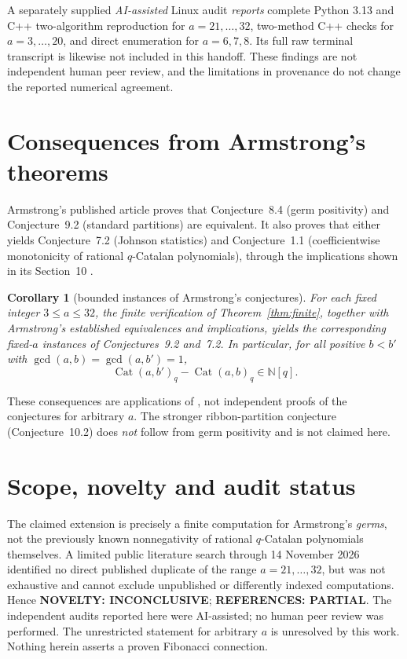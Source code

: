 \documentclass[11pt,a4paper]{article}
\newtheorem{corollary}{Corollary}
\newcommand{\NN}{\mathbb{N}}
\newcommand{\Cat}{\operatorname{Cat}}
\begin{document}
A separately supplied \emph{AI-assisted} Linux audit \emph{reports} complete Python 3.13 and C++ two-algorithm reproduction for $a=21,\ldots,32$, two-method C++ checks for $a=3,\ldots,20$, and direct enumeration for $a=6,7,8$. Its full raw terminal transcript is likewise not included in this handoff. These findings are not independent human peer review, and the limitations in provenance do not change the reported numerical agreement.

\section{Consequences from Armstrong's theorems}
Armstrong's published article proves that Conjecture~8.4 (germ positivity) and Conjecture~9.2 (standard partitions) are equivalent. It also proves that either yields Conjecture~7.2 (Johnson statistics) and Conjecture~1.1 (coefficientwise monotonicity of rational $q$-Catalan polynomials), through the implications shown in its Section~10 \cite{Armstrong2026}.
\begin{corollary}[bounded instances of Armstrong's conjectures]\label{cor:consequences}
For each fixed integer $3\le a\le32$, the finite verification of Theorem~\ref{thm:finite}, together with Armstrong's established equivalences and implications, yields the corresponding fixed-$a$ instances of Conjectures~9.2 and~7.2. In particular, for all positive $b<b'$ with $\gcd(a,b)=\gcd(a,b')=1$,
\[
\Cat(a,b')_q-\Cat(a,b)_q\in\NN[q].
\]
\end{corollary}
\noindent These consequences are applications of \cite{Armstrong2026}, not independent proofs of the conjectures for arbitrary $a$. The stronger ribbon-partition conjecture (Conjecture~10.2) does \emph{not} follow from germ positivity and is not claimed here.

\section{Scope, novelty and audit status}
The claimed extension is precisely a finite computation for Armstrong's \emph{germs}, not the previously known nonnegativity of rational $q$-Catalan polynomials themselves. A limited public literature search through 14 November 2026 identified no direct published duplicate of the range $a=21,\ldots,32$, but was not exhaustive and cannot exclude unpublished or differently indexed computations. Hence \textbf{NOVELTY: INCONCLUSIVE}; \textbf{REFERENCES: PARTIAL}. The independent audits reported here were AI-assisted; no human peer review was performed. The unrestricted statement for arbitrary $a$ is unresolved by this work. Nothing herein asserts a proven Fibonacci connection.
\end{document}
